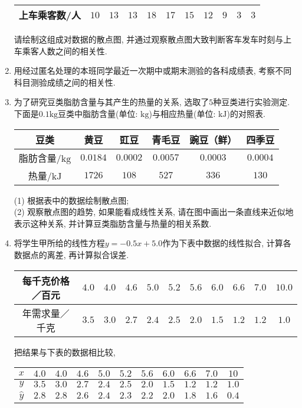 \documentclass[10pt,a4paper]{article}
\begin{document}
\begin{enumerate}[1.]
\begin{center}
\begin{tabular}{|c|c|c|c|c|c|c|c|c|c|c|}
上车乘客数/人 & $10$ & $13$ & $13$ & $18$ & $17$ & $15$ & $12$ & $9$ & $3$ & $3$ \\ \hline
\end{tabular}
\end{center}
请绘制这组成对数据的散点图, 并通过观察散点图大致判断客车发车时刻与上车乘客人数之间的相关性. 
\item 用经过匿名处理的本班同学最近一次期中或期末测验的各科成绩表, 考察不同科目测验成绩之间的相关性.
\item 为了研究豆类脂肪含量与其产生的热量的关系, 选取了$5$种豆类进行实验测定. 下面是$0. 1\text{kg}$豆类中脂肪含量(单位: $\text{kg}$)与相应热量(单位: $\text{kJ}$)的对照表.
\begin{center}
\begin{tabular}{|c|c|c|c|c|c|}
\hline
豆类 & 黄豆 & 豇豆 & 青毛豆 & 豌豆（鲜） & 四季豆 \\ \hline
脂肪含量/$\text{kg}$ & $0.0184$ & $0.0002$ & $0.0057$ & $0.0003$ & $0.0004$ \\ \hline
热量/$\text{kJ}$ & $1726$ & $108$ & $527$ & $336$ & $130$ \\ \hline
\end{tabular}
\end{center}
(1) 根据表中的数据绘制散点图;\\
(2) 观察散点图的趋势, 如果能看成线性关系, 请在图中画出一条直线来近似地表示这种关系, 并计算豆类脂肪含量与热量的相关系数. 
\item 将学生甲所给的线性方程$y=-0.5x+5.0$作为下表中数据的线性拟合, 计算各数据点的离差, 再计算拟合误差. 
\begin{center}
\begin{tabular}{|c|c|c|c|c|c|c|c|c|c|c|}
\hline
每千克价格／百元  & $4.0$ & $4.0$ & $4.6$ & $5.0$ & $5.2$ & $5.6$ & $6.0$ & $6.6$ & $7.0$ & $10.0$ \\ \hline
年需求量／千克  & $3.5$ & $3.0$ & $2.7$ & $2.4$ & $2.5$ & $2.0$ & $1.5$ & $1.2$ & $1.2$ & $1.0$ \\ \hline
\end{tabular}
\end{center}
把结果与下表的数据相比较, 
\begin{center}
\begin{tabular}{|c|c|c|c|c|c|c|c|c|c|c|}
\hline
$x$ & $4.0$ & $4.0$ & $4.6$ & $5.0$ & $5.2$ & $5.6$ & $6.0$ & $6.6$ & $7.0$ & $10$ \\ \hline
$y$ & $3.5$ & $3.0$ & $2.7$ & $2.4$ & $2.5$ & $2.0$ & $1.5$ & $1.2$ & $1.2$ & $1.0$ \\ \hline
$\hat{y}$ & $2.8$ & $2.8$ & $2.6$ & $2.4$ & $2.3$ & $2.2$ & $2.0$ & $1.8$ & $1.6$ & $0.4$ \\ \hline

\end{tabular}
\end{center}
\end{enumerate}
\end{document}
